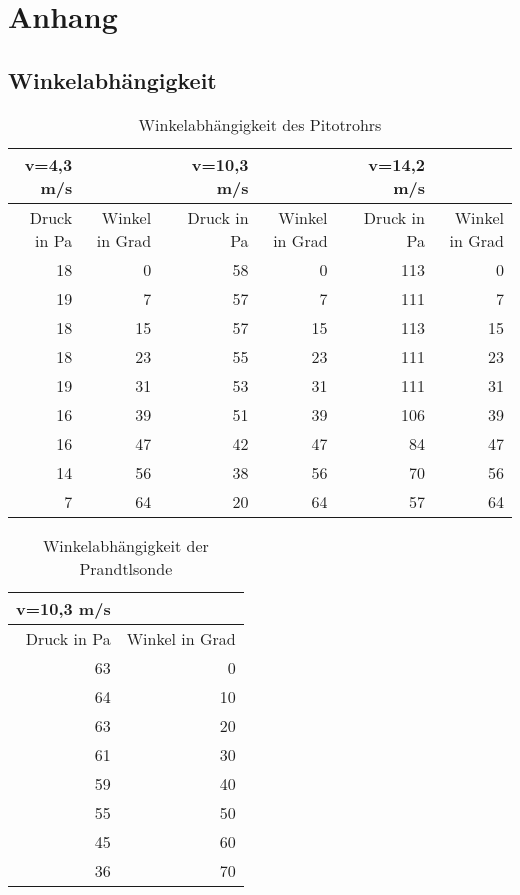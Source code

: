 \section{Anhang}
\subsection{Winkelabhängigkeit}
\begin{table}[htbp]
  \centering
  \caption{Winkelabhängigkeit des Pitotrohrs}
    \begin{tabular}{rrrrrrrr}
    \toprule
    v=4,3 m/s &       &       & v=10,3 m/s &       &       & v=14,2 m/s &  \\
    \midrule
    Druck in Pa & Winkel in Grad &       & Druck in Pa & Winkel in Grad &       & Druck in Pa & Winkel in Grad \\
    18    & 0     &       & 58    & 0     &       & 113   & 0 \\
    19    & 7     &       & 57    & 7     &       & 111   & 7 \\
    18    & 15    &       & 57    & 15    &       & 113   & 15 \\
    18    & 23    &       & 55    & 23    &       & 111   & 23 \\
    19    & 31    &       & 53    & 31    &       & 111   & 31 \\
    16    & 39    &       & 51    & 39    &       & 106   & 39 \\
    16    & 47    &       & 42    & 47    &       & 84    & 47 \\
    14    & 56    &       & 38    & 56    &       & 70    & 56 \\
    7     & 64    &       & 20    & 64    &       & 57    & 64 \\
    \bottomrule
    \end{tabular}%
  \label{tab:Winkel}%
\end{table}%

\begin{table}[htbp]
  \centering
  \caption{Winkelabhängigkeit der Prandtlsonde}
    \begin{tabular}{rr}
    \toprule
    v=10,3 m/s &  \\
    \midrule
    Druck in Pa & Winkel in Grad \\
    63    & 0 \\
    64    & 10 \\
    63    & 20 \\
    61    & 30 \\
    59    & 40 \\
    55    & 50 \\
    45    & 60 \\
    36    & 70 \\
    \bottomrule
    \end{tabular}%
  \label{tab:Winkelnormalrohr}%
\end{table}%

